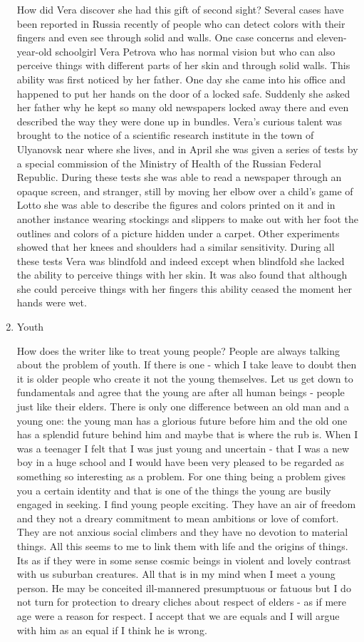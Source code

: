 \begin{enumerate}
How did Vera discover she had this gift of second sight? Several cases have been reported in Russia recently of people who can detect colors with their fingers and even see through solid and walls.
One case concerns and eleven-year-old schoolgirl Vera Petrova who has normal vision but who can also perceive things with different parts of her skin and through solid walls.
This ability was first noticed by her father.
One day she came into his office and happened to put her hands on the door of a locked safe.
Suddenly she asked her father why he kept so many old newspapers locked away there and even described the way they were done up in bundles.
Vera's curious talent was brought to the notice of a scientific research institute in the town of Ulyanovsk near where she lives, and in April she was given a series of tests by a special commission of the Ministry of Health of the Russian Federal Republic.
During these tests she was able to read a newspaper through an opaque screen, and stranger, still by moving her elbow over a child's game of Lotto she was able to describe the figures and colors printed on it and in another instance wearing stockings and slippers to make out with her foot the outlines and colors of a picture hidden under a carpet.
Other experiments showed that her knees and shoulders had a similar sensitivity.
During all these tests Vera was blindfold and indeed except when blindfold she lacked the ability to perceive things with her skin.
It was also found that although she could perceive things with her fingers this ability ceased the moment her hands were wet.


\item Youth 

How does the writer like to treat young people? People are always talking about the problem of youth.
If there is one - which I take leave to doubt  then it is older people who create it not the young themselves.
Let us get down to fundamentals and agree that the young are after all human beings - people just like their elders.
There is only one difference between an old man and a young one: the young man has a glorious future before him and the old one has a splendid future behind him and maybe that is where the rub is.
When I was a teenager I felt that I was just young and uncertain - that I was a new boy in a huge school and I would have been very pleased to be regarded as something so interesting as a problem.
For one thing being a problem gives you a certain identity and that is one of the things the young are busily engaged in seeking.
I find young people exciting.
They have an air of freedom and they not a dreary commitment to mean ambitions or love of comfort.
They are not anxious social climbers and they have no devotion to material things.
All this seems to me to link them with life and the origins of things.
Its as if they were in some sense cosmic beings in violent and lovely contrast with us suburban creatures.
All that is in my mind when I meet a young person.
He may be conceited ill-mannered presumptuous or fatuous but I do not turn for protection to dreary cliches about respect of elders - as if mere age were a reason for respect.
I accept that we are equals and I will argue with him as an equal if I think he is wrong.



\end{enumerate}
